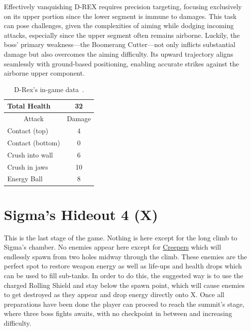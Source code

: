 Effectively vanquishing D-REX requires precision targeting, focusing exclusively on its upper portion since the lower segment is immune to damages. This task can pose challenges, given the complexities of aiming while dodging incoming attacks, especially since the upper segment often remains airborne. Luckily, the boss' primary weakness—the Boomerang Cutter—not only inflicts substantial damage but also overcomes the aiming difficulty. Its upward trajectory aligns seamlessly with ground-based positioning, enabling accurate strikes against the airborne upper component.


\begin{table}[h]
	\centering
	\begin{tabular}[htp]{l c}
		\toprule
		Total Health  & 32\\
		\midrule
		\multicolumn{1}{c}{Attack} & \multicolumn{1}{c}{Damage}\\
		Contact (top) & 4\\
		Contact (bottom) & 0\\
		Crush into wall & 6\\
		Crush in jaws & 10\\
		Energy Ball & 8\\
		\bottomrule
	\end{tabular}
	\caption{D-Rex's in-game data~\cite{wiki:D-REX}.}
\end{table}

\section{Sigma's Hideout 4 (X)}
This is the last stage of the game. Nothing  is here except for the long climb to Sigma's chamber. No enemies appear here except for \hyperlink{enem:Creeper}{Creepers} which will endlessly spawn from two holes midway through the climb. These enemies are the perfect spot to restore weapon energy as well as life-ups and health drops which can be used to fill sub-tanks. In order to do this, the suggested way is to use the charged Rolling Shield and stay below the spawn point, which will cause enemies to get destroyed as they appear and drop energy directly onto X. Once all preparations have been done the player can proceed to reach the summit's stage, where three boss fights awaits, with no checkpoint in between and increasing difficulty.

